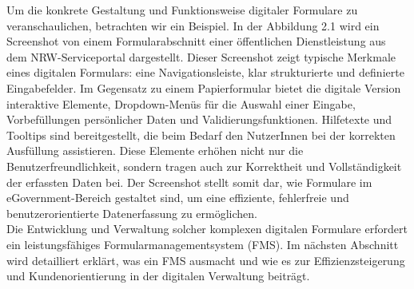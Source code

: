 Um die konkrete Gestaltung und Funktionsweise digitaler Formulare zu veranschaulichen, betrachten wir ein Beispiel. In der Abbildung 2.1 wird ein Screenshot von einem  Formularabschnitt einer öffentlichen Dienstleistung aus dem NRW-Serviceportal dargestellt. Dieser Screenshot zeigt typische Merkmale eines digitalen Formulars: eine Navigationsleiste, klar strukturierte und definierte Eingabefelder. Im Gegensatz zu einem Papierformular bietet die digitale Version interaktive Elemente, Dropdown-Menüs für die Auswahl einer Eingabe, Vorbefüllungen persönlicher Daten und Validierungsfunktionen. Hilfetexte und Tooltips sind bereitgestellt, die beim Bedarf den NutzerInnen bei der korrekten Ausfüllung assistieren. Diese Elemente erhöhen nicht nur die Benutzerfreundlichkeit, sondern tragen auch zur Korrektheit und Vollständigkeit der erfassten Daten bei. Der Screenshot stellt somit dar, wie Formulare im eGovernment-Bereich gestaltet sind, um eine effiziente, fehlerfreie und benutzerorientierte Datenerfassung zu ermöglichen. \\

Die Entwicklung und Verwaltung solcher komplexen digitalen Formulare erfordert ein leistungsfähiges Formularmanagementsystem (FMS). Im nächsten Abschnitt wird detailliert erklärt, was ein FMS ausmacht und wie es zur Effizienzsteigerung und Kundenorientierung in der digitalen Verwaltung beiträgt.











